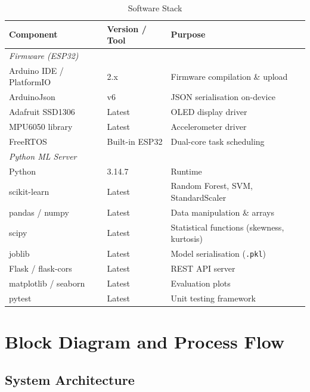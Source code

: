\documentclass[12pt,a4paper]{report}
\begin{document}
\begin{table}[H]
  \centering
  \caption{Software Stack}
  \label{tab:software}
  \begin{tabular}{lll}
    \toprule
    \textbf{Component} & \textbf{Version / Tool} & \textbf{Purpose} \\
    \midrule
    \multicolumn{3}{l}{\textit{Firmware (ESP32)}} \\
    Arduino IDE / PlatformIO & 2.x & Firmware compilation \& upload \\
    ArduinoJson & v6 & JSON serialisation on-device \\
    Adafruit SSD1306 & Latest & OLED display driver \\
    MPU6050 library & Latest & Accelerometer driver \\
    FreeRTOS & Built-in ESP32 & Dual-core task scheduling \\
    \midrule
    \multicolumn{3}{l}{\textit{Python ML Server}} \\
    Python & 3.14.7 & Runtime \\
    scikit-learn & Latest & Random Forest, SVM, StandardScaler \\
    pandas / numpy & Latest & Data manipulation \& arrays \\
    scipy & Latest & Statistical functions (skewness, kurtosis) \\
    joblib & Latest & Model serialisation (\texttt{.pkl}) \\
    Flask / flask-cors & Latest & REST API server \\
    matplotlib / seaborn & Latest & Evaluation plots \\
    pytest & Latest & Unit testing framework \\
    \bottomrule
  \end{tabular}
\end{table}

\section{Block Diagram and Process Flow}

\subsection{System Architecture}
\end{document}
